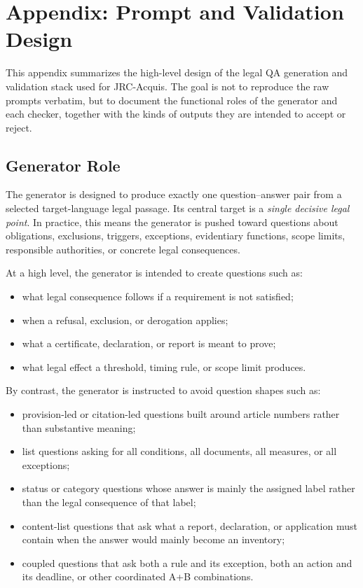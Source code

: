 \section{Appendix: Prompt and Validation Design}

This appendix summarizes the high-level design of the legal QA generation and validation stack used for JRC-Acquis. The goal is not to reproduce the raw prompts verbatim, but to document the functional roles of the generator and each checker, together with the kinds of outputs they are intended to accept or reject.

\subsection{Generator Role}

The generator is designed to produce exactly one question--answer pair from a selected target-language legal passage. Its central target is a \emph{single decisive legal point}. In practice, this means the generator is pushed toward questions about obligations, exclusions, triggers, exceptions, evidentiary functions, scope limits, responsible authorities, or concrete legal consequences.

At a high level, the generator is intended to create questions such as:
\begin{itemize}
\item what legal consequence follows if a requirement is not satisfied;
\item when a refusal, exclusion, or derogation applies;
\item what a certificate, declaration, or report is meant to prove;
\item what legal effect a threshold, timing rule, or scope limit produces.
\end{itemize}

By contrast, the generator is instructed to avoid question shapes such as:
\begin{itemize}
\item provision-led or citation-led questions built around article numbers rather than substantive meaning;
\item list questions asking for all conditions, all documents, all measures, or all exceptions;
\item status or category questions whose answer is mainly the assigned label rather than the legal consequence of that label;
\item content-list questions that ask what a report, declaration, or application must contain when the answer would mainly become an inventory;
\item coupled questions that ask both a rule and its exception, both an action and its deadline, or other coordinated A+B combinations.
\end{itemize}

